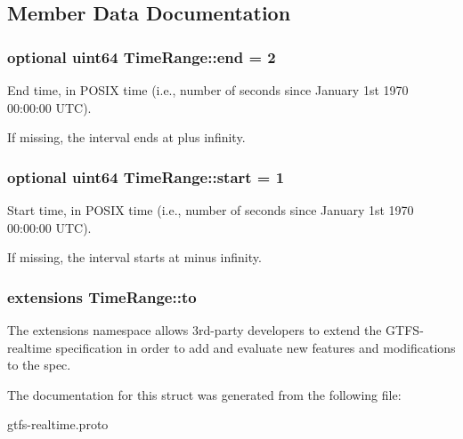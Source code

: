 \subsection{Member Data Documentation}
\subsubsection[{\texorpdfstring{end}{end}}]{\setlength{\rightskip}{0pt plus 5cm}optional uint64 Time\+Range\+::end = 2}\hypertarget{structTimeRange_ada44c45a7e5419e7dbc7322f56002a32}{}\label{structTimeRange_ada44c45a7e5419e7dbc7322f56002a32}


End time, in P\+O\+S\+IX time (i.\+e., number of seconds since January 1st 1970 00\+:00\+:00 U\+TC). 

If missing, the interval ends at plus infinity. 
\subsubsection[{\texorpdfstring{start}{start}}]{\setlength{\rightskip}{0pt plus 5cm}optional uint64 Time\+Range\+::start = 1}\hypertarget{structTimeRange_a58a6afe3f10babe6dcbaf203fb83c26c}{}\label{structTimeRange_a58a6afe3f10babe6dcbaf203fb83c26c}


Start time, in P\+O\+S\+IX time (i.\+e., number of seconds since January 1st 1970 00\+:00\+:00 U\+TC). 

If missing, the interval starts at minus infinity. 
\subsubsection[{\texorpdfstring{to}{to}}]{\setlength{\rightskip}{0pt plus 5cm}extensions Time\+Range\+::to}\hypertarget{structTimeRange_ac6a65d679a5abc8bfaf635d9258e1ef6}{}\label{structTimeRange_ac6a65d679a5abc8bfaf635d9258e1ef6}


The extensions namespace allows 3rd-\/party developers to extend the G\+T\+F\+S-\/realtime specification in order to add and evaluate new features and modifications to the spec. 



The documentation for this struct was generated from the following file\+:\begin{DoxyCompactItemize}
\item 
gtfs-\/realtime.\+proto\end{DoxyCompactItemize}
